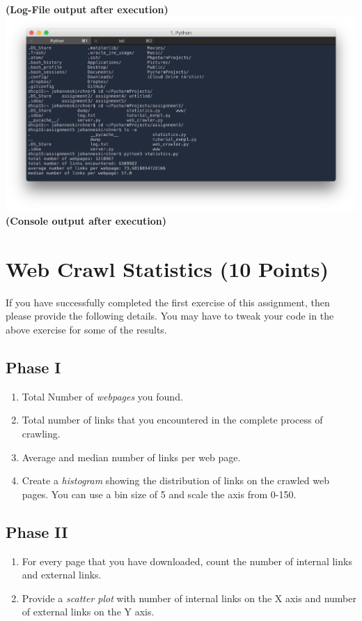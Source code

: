 \documentclass{WeSTassignment}
\begin{document}
\textbf{(Log-File output after execution)}\\
\hspace*{-100px}
\includegraphics[width=610px]{console_output}
\textbf{(Console output after execution)}


\section{Web Crawl Statistics (10 Points)}

If you have successfully completed the first exercise of this assignment, then please provide the following details. You may have to tweak your code in the above exercise for some of the results. 
\subsection{Phase I}
\begin{enumerate}
\item Total Number of \emph{webpages} you found.
\item Total number of links that you encountered in the complete process of crawling.
\item Average and median number of links per web page.
\item Create a \emph{histogram} showing the distribution of links on the crawled web pages. You can use a bin size of 5 and scale the axis from 0-150.
\end{enumerate}

\subsection{Phase II}
\begin{enumerate}
\item For every page that you have downloaded, count the number of internal links and external links. 
\item Provide a \emph{scatter plot} with number of internal links on the X axis and number of external links on the Y axis.
\end{enumerate}
\end{document}
